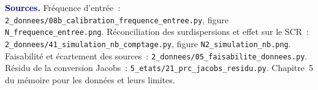 \documentclass[11pt,a4paper]{article}
\begin{document}
\smallskip
\sloppy
\noindent\footnotesize\textcolor{navy}{\textbf{Sources.}} Fréquence d'entrée~:
\texttt{2\_donnees/08b\_calibration\_frequence\_entree.py}, figure
\texttt{N\_frequence\_entree.png}. Réconciliation des surdispersions et effet sur le SCR~:
\texttt{2\_donnees/41\_simulation\_nb\_comptage.py}, figure \texttt{N2\_simulation\_nb.png}.
Faisabilité et écartement des sources~:
\texttt{2\_donnees/05\_faisabilite\_donnees.py}. Résidu de la conversion Jacobs~:
\texttt{5\_etats/21\_prc\_jacobs\_residu.py}. Chapitre~5 du mémoire pour les données et
leurs limites.
\end{document}
